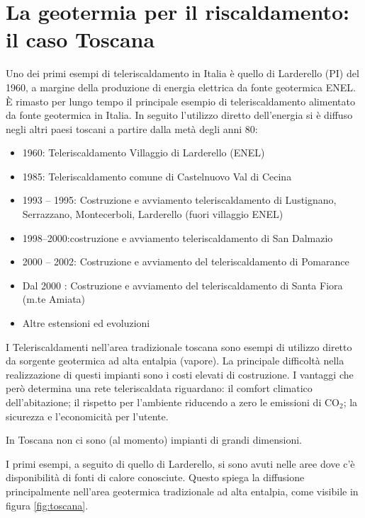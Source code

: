 \documentclass[laurea,oneside,11pt]{USiena_tesiLM}
\begin{document}
\section{La geotermia per il riscaldamento: il caso Toscana}
Uno dei primi esempi di teleriscaldamento in Italia è quello di Larderello (PI) del 1960, a margine della produzione di energia elettrica da fonte geotermica ENEL. È rimasto per lungo tempo il principale esempio di teleriscaldamento alimentato da fonte geotermica in Italia.
In seguito l'utilizzo diretto dell'energia si è diffuso negli altri paesi toscani a partire dalla metà degli anni 80: 
\begin{itemize}
\item 1960: Teleriscaldamento Villaggio di Larderello
(ENEL)
\item 1985: Teleriscaldamento comune di Castelnuovo Val di Cecina
\item 1993 – 1995: Costruzione e avviamento teleriscaldamento di Lustignano, Serrazzano, Montecerboli, Larderello (fuori villaggio ENEL)
\item 1998–2000:costruzione e avviamento teleriscaldamento di San Dalmazio
\item 2000 – 2002: Costruzione e avviamento del teleriscaldamento di Pomarance
\item Dal 2000 : Costruzione e avviamento del teleriscaldamento di Santa Fiora (m.te Amiata)
\item Altre estensioni ed evoluzioni
\end{itemize}

I Teleriscaldamenti nell'area tradizionale toscana sono esempi di utilizzo diretto da sorgente geotermica ad alta entalpia (vapore). La principale difficoltà nella realizzazione di questi impianti sono i costi elevati di costruzione. I vantaggi che però determina una rete teleriscaldata riguardano: il comfort climatico dell'abitazione; il rispetto per l'ambiente riducendo a zero le emissioni di CO$_2$; la sicurezza e l'economicità per l'utente. 

In Toscana non ci sono (al momento) impianti di grandi dimensioni.

I primi esempi, a seguito di quello di Larderello, si sono avuti nelle aree dove c'è disponibilità di fonti di calore conosciute.
Questo spiega la diffusione principalmente nell'area geotermica tradizionale ad alta entalpia, come visibile in figura \ref{fig:toscana}.
\end{document}
